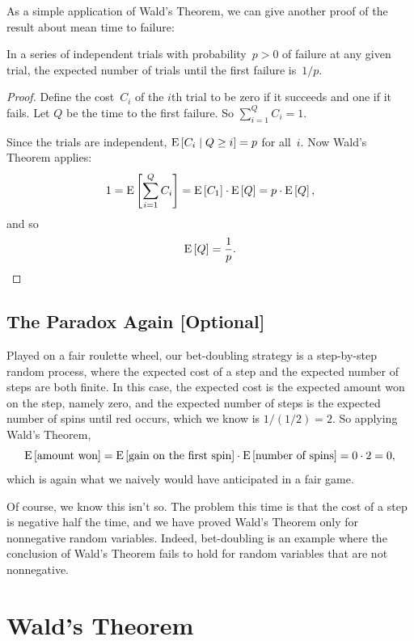 \documentclass[11pt,twoside]{article}
\begin{document}
As a simple application of Wald's Theorem, we can give another proof of
the result about mean time to failure:
\begin{corollary}\label{meantime}
In a series of independent trials with probability~$p>0$ of failure at any
given trial, the expected number of trials until the first failure
is~$1/p$.
\end{corollary}

\begin{proof}
Define the cost~$C_i$ of the $i$th trial to be zero if it succeeds and
one if it fails.  Let $Q$ be the time to the first failure.  So
$\sum_{i = 1}^Q C_i = 1$.

Since the trials are independent, $\mathop{\textup{E}}\nolimits\left[C_i\mid Q \geq i\right] = p$ for
all~$i$.  Now Wald's Theorem applies:
\[
    1 = \mathop{\textup{E}}\nolimits\left[\sum_{i = 1}^Q C_i\right]
      = \mathop{\textup{E}}\nolimits\left[C_1\right] \cdot \mathop{\textup{E}}\nolimits\left[Q\right]
      = p \cdot \mathop{\textup{E}}\nolimits\left[Q\right],
\]
and so
\[
    \mathop{\textup{E}}\nolimits\left[Q\right] = \frac{1}{p}.
\]
\end{proof}

\subsection{The Paradox Again [Optional]}

\begin{optional}

Played on a fair roulette wheel, our bet-doubling strategy is a
step-by-step random process, where the expected cost of a step and the
expected number of steps are both finite.  In this case, the expected cost
is the expected amount won on the step, namely zero, and the expected
number of steps is the expected number of spins until red occurs, which we
know is $1/(1/2) = 2$.  So applying Wald's Theorem,
\[
\mathop{\textup{E}}\nolimits\left[\mbox{amount won}\right]  =  \mathop{\textup{E}}\nolimits\left[\mbox{gain on the first
spin}\right]\cdot \mathop{\textup{E}}\nolimits\left[\mbox{number of spins}\right] =  0 \cdot 2 = 0,
\]
which is again what we naively would have anticipated in a fair game.

Of course, we know this isn't so.  The problem this time is that the cost
of a step is negative half the time, and we have proved Wald's Theorem
only for nonnegative random variables.  Indeed, bet-doubling is an example
where the conclusion of Wald's Theorem fails to hold for random variables
that are not nonnegative.

\end{optional}

\section{Wald's Theorem}
\end{document}
